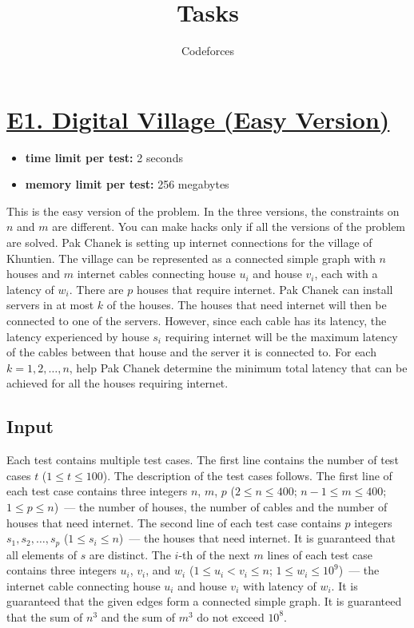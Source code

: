 \documentclass{article}
\date{}
\title{Tasks}
\author{Codeforces}
\begin{document}
\maketitle

\section{\href{https://codeforces.com/problemset/problem/2021/E1}{E1. Digital Village (Easy Version)}}

\begin{itemize}
\item \textbf{time limit per test:}  2 seconds
\item \textbf{memory limit per test:}  256 megabytes
\end{itemize}
This is the easy version of the problem. In the three versions, the constraints on $n$ and $m$ are different. You can make hacks only if all the versions of the problem are solved. Pak Chanek is setting up internet connections for the village of Khuntien. The village can be represented as a connected simple graph with $n$ houses and $m$ internet cables connecting house $u_i$ and house $v_i$, each with a latency of $w_i$. There are $p$ houses that require internet. Pak Chanek can install servers in at most $k$ of the houses. The houses that need internet will then be connected to one of the servers. However, since each cable has its latency, the latency experienced by house $s_i$ requiring internet will be the maximum latency of the cables between that house and the server it is connected to. For each $k = 1,2,\ldots,n$, help Pak Chanek determine the minimum total latency that can be achieved for all the houses requiring internet.

\subsection*{Input}
 Each test contains multiple test cases. The first line contains the number of test cases $t$ ($1 \le t \le 100$). The description of the test cases follows. The first line of each test case contains three integers $n$, $m$, $p$ ($2 \le n \le 400$; $n-1 \le m \le 400$; $1 \le p \le n$) — the number of houses, the number of cables and the number of houses that need internet. The second line of each test case contains $p$ integers $s_1, s_2, \ldots, s_p$ ($1 \le s_i \le n$) — the houses that need internet. It is guaranteed that all elements of $s$ are distinct. The $i$-th of the next $m$ lines of each test case contains three integers $u_i$, $v_i$, and $w_i$ ($1 \le u_i < v_i \le n$; $1 \le w_i \le 10^9$) — the internet cable connecting house $u_i$ and house $v_i$ with latency of $w_i$. It is guaranteed that the given edges form a connected simple graph. It is guaranteed that the sum of $n^3$ and the sum of $m^3$ do not exceed $10^8$.
\end{document}
